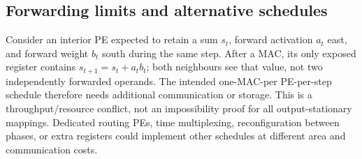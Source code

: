 \subsection{Forwarding limits and alternative schedules}

Consider an interior PE expected to retain a sum $s_t$, forward activation
$a_t$ east, and forward weight $b_t$ south during the same step. After a MAC,
its only exposed register contains $s_{t+1}=s_t+a_tb_t$; both neighbours see
that value, not two independently forwarded operands. The intended one-MAC-per
PE-per-step schedule therefore needs additional communication or storage.
This is a throughput/resource conflict, not an impossibility proof for all
output-stationary mappings. Dedicated routing PEs, time multiplexing,
reconfiguration between phases, or extra registers could implement other
schedules at different area and communication costs.
